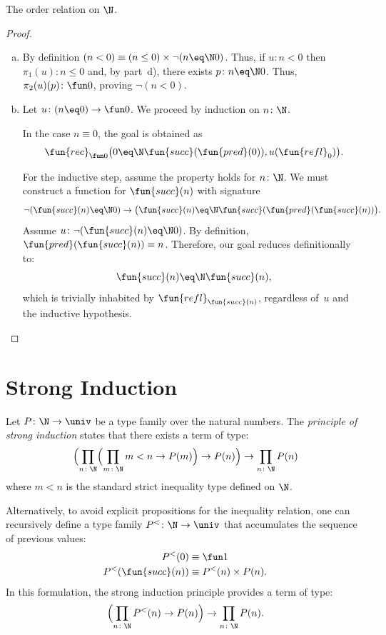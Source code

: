 \begin{lpar}{The order relation on $\N$.}
\begin{proof}
\begin{enumerate}[a)]
            \item By definition $(n<0)\equiv(n\le0)\times\neg(n\eq\N0)$. Thus, if $u\colon n<0$ then $\pi_1(u)\colon n\le0$ and, by part~d), there exists $p\colon n\eq\N0$. Thus, $\pi_2(u)(p)\colon\fun0$, proving $\neg(n<0)$.

            \item Let $u\colon(n\eq0)\to\fun0$. We proceed by induction on $n\colon\N$.
    
            In the case $n\equiv0$, the goal is obtained as
            \[
                \fun{rec}_{\fun0}
                    \bigl(
                        0\eq\N\fun{succ}(\fun{pred}(0)), u(\fun{refl}_0)
                    \bigr).
            \]
            
            For the inductive step, assume the property holds for $n\colon\N$. We must construct a function for $\fun{succ}(n)$ with signature
            \[
                \neg(\fun{succ}(n)\eq\N0)
                    \to
                    \bigl(
                    \fun{succ}(n)\eq\N\fun{succ}(\fun{pred}(\fun{succ}(n))
                    \bigr).
            \]
            Assume $u\colon\neg(\fun{succ}(n)\eq\N0)$. By definition, $\fun{pred}(\fun{succ}(n))\equiv n$. Therefore, our goal reduces definitionally to:
            \[
                \fun{succ}(n)\eq\N\fun{succ}(n),
            \]
            which is trivially inhabited by $\fun{refl}_{\fun{succ}(n)}$, regardless of~$u$ and the inductive hypothesis.\qedhere
        \end{enumerate}
    \end{proof}
\end{lpar}

\section{Strong Induction}

\begin{thm}
    Let\/ $P\colon\N\to\univ$ be a type family over the natural numbers. The \textsl{principle of strong induction} states that there exists a term of type:
    \[
        \Bigl(
            \prod_{n\colon\N}
                \Bigl(
                    \prod_{m\colon\N}m<n\to P(m)
                \Bigr)
                \to P(n)
        \Bigr)
        \to\prod_{n\colon\N}P(n)
    \]
    where\/ $m<n$ is the standard strict inequality type defined on\/ $\N$.
    
    Alternatively, to avoid explicit propositions for the inequality relation, one can recursively define a type family\/ $P^{<}\colon\N\to\univ$ that accumulates the sequence of previous values:
    \begin{align*}
        P^{<}(0)&\equiv\fun1\\
        P^{<}(\fun{succ}(n))&\equiv P^{<}(n)\times P(n).
    \end{align*}
    In this formulation, the strong induction principle provides a term of type:
    \[
        \Bigl(
            \prod_{n\colon\N}P^<(n)\to P(n)
        \Bigr)
        \to \prod_{n\colon\N}P(n).
    \]
\end{thm}

